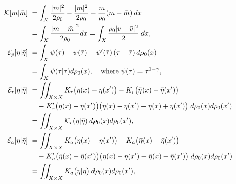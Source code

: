 \documentclass[10pt, letterpaper]{article}
\def\K{{\mathcal{K}}}
\theoremstyle{definition}
\theoremstyle{remark}
\begin{document}
\begin{align} \small
    \K[{m} | \bar{m}] 
     &\ =\int_X \frac{|{m}|^2}{2\rho_0}- \frac{|\bar{m}|^2}{2\rho_0} - \frac{\bar{m}}{\rho_0}({m}-\bar{m})\:dx \nonumber\\ 
     &\ = \int_X \frac{|{m} - {\bar{m}|}^2}{2\rho_0}dx  = \int_X \frac{\rho_0 |{v} - {\bar{v}}|^2}{2} \: dx, \label{expK}\\
    \mathcal{E}_p[\eta | \bar{\eta}] 
     & \  =\int_{X}^{}\psi(\tau) - \psi(\bar\tau) - \psi'(\bar\tau)\left( \tau - \bar{\tau} \right)d\rho_0(x) \label{exp1}\\
     & \ = \int_X\psi(\tau |\bar{\tau} ) d\rho_0(x), \quad \text{where $\psi(\tau)=\tau^{1-\gamma}$,}\nonumber \\
    \mathcal{E}_r[\eta | \bar{\eta}] 
    & \  =\iint_{X \times X}{K}_r\big(\eta(x)-\eta(x')\big) - {K}_r\big(\bar{\eta}(x)-\bar{\eta}(x')\big) \nonumber\\ 
    & \ \quad - {K}_r'\big(\bar{\eta}(x) - \bar{\eta}(x')\big)\big( \eta(x) - \eta(x') - \bar{\eta}(x) + \bar{\eta}(x') \big) \: d\rho_0(x)d\rho_0(x') \label{exp2}\\
    & \ = \iint_{X \times X} \mathcal{K}_r(\eta | \bar{\eta}) \: d\rho_0(x)d\rho_0(x'), \nonumber\\
    \mathcal{E}_a[\eta | \bar{\eta}] 
    & \ =\iint_{X \times X}{K}_a\big(\eta(x)-\eta(x')\big) - {K}_a\big(\bar{\eta}(x)-\bar{\eta}(x')\big) \nonumber \label{exp3}\\ 
    & \ \quad - {K}_a'\big(\bar{\eta}(x) - \bar{\eta}(x')\big)\big( \eta(x) - \eta(x') - \bar{\eta}(x) + \bar{\eta}(x') \big) \: d\rho_0(x)d\rho_0(x') \\
    & \ = \iint_{X \times X}{K}_a\big(\eta | \bar{\eta}\big) \: d\rho_0(x)d\rho_0(x'), \nonumber
\end{align}
\end{document}
